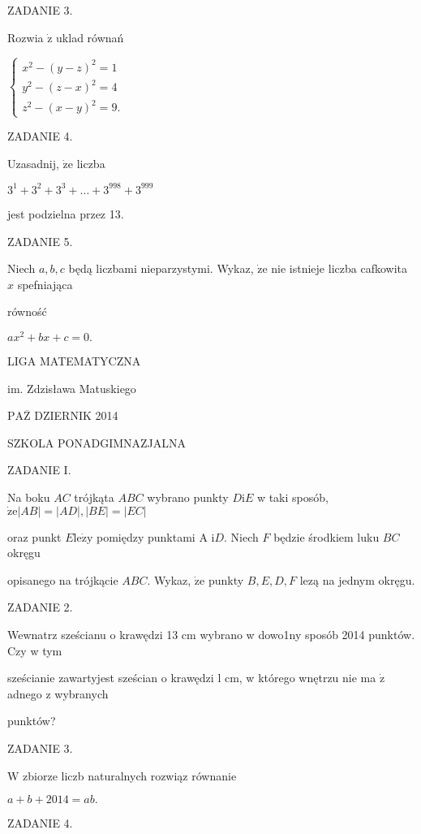 \documentclass[a4paper,12pt]{article}
\begin{document}
ZADANIE 3.

Rozwia $\dot{\mathrm{z}}$ uklad równań

$\left\{\begin{array}{l}
x^{2}-(y-z)^{2}=1\\
y^{2}-(z-x)^{2}=4\\
z^{2}-(x-y)^{2}=9.
\end{array}\right.$

ZADANIE 4.

Uzasadnij, $\dot{\mathrm{z}}\mathrm{e}$ liczba

$3^{1}+3^{2}+3^{3}+\ldots+3^{998}+3^{999}$

jest podzielna przez 13.

ZADANIE 5.

Niech $a, b, c$ będą liczbami nieparzystymi. Wykaz, $\dot{\mathrm{z}}\mathrm{e}$ nie istnieje liczba cafkowita $x$ spefniająca

równość

$ax^{2}+bx+c=0.$






LIGA MATEMATYCZNA

im. Zdzisława Matuskiego

$\mathrm{P}\mathrm{A}\overline{\mathrm{Z}}$ DZIERNIK 2014

SZKOLA PONADGIMNAZJALNA

ZADANIE I.

Na boku $AC$ trójkąta $ABC$ wybrano punkty $D\mathrm{i}E$ w taki sposób, $\dot{\mathrm{z}}\mathrm{e}|AB|=|AD|, |BE|=|EC|$

oraz punkt $E \mathrm{l}\mathrm{e}\dot{\mathrm{z}}\mathrm{y}$ pomiędzy punktami A $\mathrm{i} D$. Niech $F$ będzie środkiem luku $BC$ okręgu

opisanego na trójkącie $ABC$. Wykaz, $\dot{\mathrm{z}}\mathrm{e}$ punkty $B, E, D, F$ lezą na jednym okręgu.

ZADANIE 2.

Wewnatrz sześcianu o krawędzi 13 cm wybrano w dowo1ny sposób 2014 punktów. Czy w tym

sześcianie zawartyjest sześcian o krawędzi l cm, w którego wnętrzu nie ma $\dot{\mathrm{z}}$ adnego z wybranych

punktów?

ZADANIE 3.

$\mathrm{W}$ zbiorze liczb naturalnych rozwiąz równanie

$a+b+2014=ab.$

ZADANIE 4.
\end{document}
